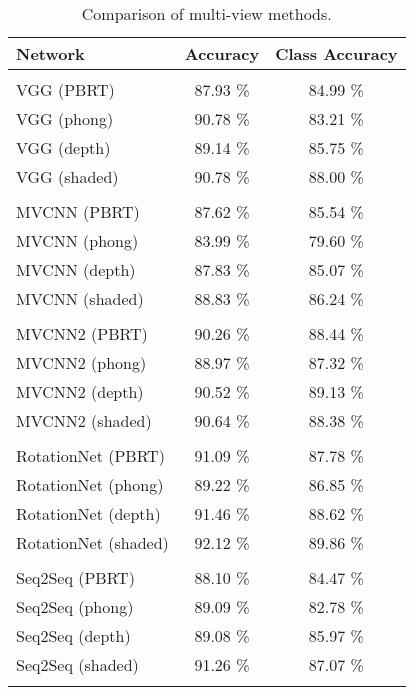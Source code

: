 \begin{table}[]
	\centering
	\begin{tabular}{lcc}
		\hline
		\textbf{Network}     & \textbf{Accuracy} & \textbf{Class Accuracy } \\ \hline
		                     &                   &                         \\
		VGG (PBRT)           &     87.93 \%      &        84.99 \%         \\
		VGG (phong)          &     90.78 \%      &        83.21 \%         \\
		VGG (depth)          &     89.14 \%      &        85.75 \%         \\
		VGG (shaded)         &     90.78 \%      &        88.00 \%         \\
		                     &                   &                         \\
		MVCNN (PBRT)         &     87.62 \%      &        85.54 \%         \\
		MVCNN (phong)        &     83.99 \%      &        79.60 \%         \\
		MVCNN (depth)        &     87.83 \%      &        85.07 \%         \\
		MVCNN (shaded)       &     88.83 \%      &        86.24 \%         \\
		                     &                   &                         \\
		MVCNN2 (PBRT)        &     90.26 \%      &        88.44 \%         \\
		MVCNN2 (phong)       &     88.97 \%      &        87.32 \%         \\
		MVCNN2 (depth)       &     90.52 \%      &        89.13 \%         \\
		MVCNN2 (shaded)      &     90.64 \%      &        88.38 \%         \\
		                     &                   &                         \\
		RotationNet (PBRT)   &     91.09 \%      &        87.78 \%         \\
		RotationNet (phong)  &     89.22 \%      &        86.85 \%         \\
		RotationNet (depth)  &     91.46 \%      &        88.62 \%         \\
		RotationNet (shaded) &     92.12 \%      &        89.86 \%         \\
		                     &                   &                         \\
		Seq2Seq  (PBRT)      &     88.10 \%      &        84.47 \%         \\
		Seq2Seq  (phong)     &     89.09 \%      &        82.78 \%         \\
		Seq2Seq  (depth)     &     89.08 \%      &        85.97 \%         \\
		Seq2Seq  (shaded)    &     91.26 \%      &        87.07 \%         \\
		                     &                   &                         \\ \hline
	\end{tabular}
\caption{Comparison of multi-view methods.}
\label{Table:mv}
\end{table}